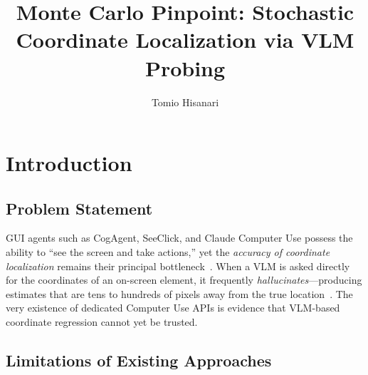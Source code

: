 \documentclass[sigconf,nonacm]{acmart}
\title{Monte Carlo Pinpoint: Stochastic Coordinate Localization via VLM Probing}
\author{Tomio Hisanari}
\affiliation{%
  \institution{Independent Researcher}
  \country{Japan}
}
\begin{document}
\maketitle

\setlength{\emergencystretch}{5em}
\hypersetup{breaklinks=true}

\section{Introduction}

\subsection{Problem Statement}

GUI agents such as CogAgent, SeeClick, and Claude Computer Use possess
the ability to ``see the screen and take actions,'' yet the
\emph{accuracy of coordinate localization} remains their principal
bottleneck~\cite{seeclick,uitars}.
When a VLM is asked directly for the coordinates of an on-screen
element, it frequently \emph{hallucinates}---producing estimates that
are tens to hundreds of pixels away from the true
location~\cite{localization-biases}.
The very existence of dedicated Computer Use APIs is evidence that
VLM-based coordinate regression cannot yet be trusted.

\subsection{Limitations of Existing Approaches}

\begin{table}[t]
\caption{Limitations of existing coordinate localization approaches.}
\label{tab:existing-limits}
\end{table}
\end{document}
